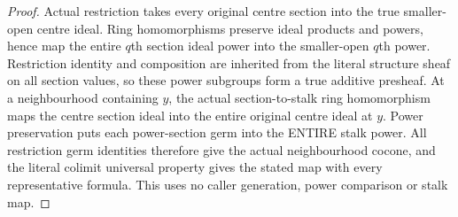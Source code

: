 \begin{proof}
Actual restriction takes every original centre section into the true
smaller-open centre ideal. Ring homomorphisms preserve ideal products and
powers, hence map the entire $q$th section ideal power into the smaller-open
$q$th power. Restriction identity and composition are inherited from the
literal structure sheaf on all section values, so these power subgroups
form a true additive presheaf. At a neighbourhood containing $y$, the
actual section-to-stalk ring homomorphism maps the centre section ideal
into the entire original centre ideal at $y$. Power preservation puts each
power-section germ into the ENTIRE stalk power. All restriction germ
identities therefore give the actual neighbourhood cocone, and the literal
colimit universal property gives the stated map with every representative
formula. This uses no caller generation, power comparison or stalk map.
\end{proof}

